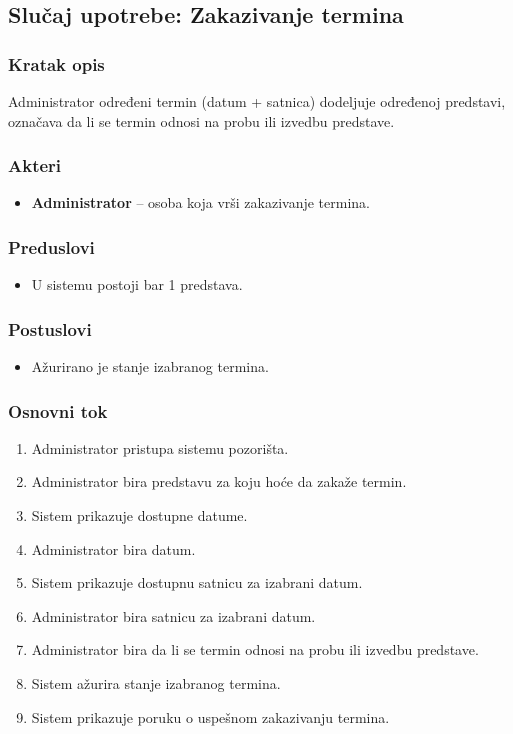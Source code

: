 \subsection{Slučaj upotrebe: Zakazivanje termina}

\subsubsection*{Kratak opis}
Administrator određeni termin (datum + satnica) dodeljuje određenoj predstavi, označava da li se termin odnosi na probu ili izvedbu predstave.

\subsubsection*{Akteri}
\begin{itemize}
    \item \textbf{Administrator} -- osoba koja vrši zakazivanje termina.
\end{itemize}
\subsubsection*{Preduslovi}
\begin{itemize}
    \item  U sistemu postoji bar 1 predstava.
\end{itemize}

\subsubsection*{Postuslovi}
\begin{itemize}
    \item Ažurirano je stanje izabranog termina.
\end{itemize}

\subsubsection*{Osnovni tok}
\begin{enumerate}
    \item Administrator pristupa sistemu pozorišta.
    \item Administrator bira predstavu za koju hoće da zakaže termin.
    \item Sistem prikazuje dostupne datume.
    \item Administrator bira datum.
    \item Sistem prikazuje dostupnu satnicu za izabrani datum.
    \item Administrator bira satnicu za izabrani datum.
    \item Administrator bira da li se termin odnosi na probu ili izvedbu predstave.
    \item Sistem ažurira stanje izabranog termina.
    \item Sistem prikazuje poruku o uspešnom zakazivanju termina.
\end{enumerate}

